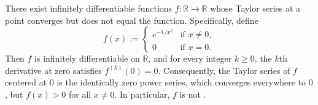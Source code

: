 \begin{theorem} \label{theorem:example_of_a_smooth_function_with_vanishing_taylor_series_not_equal_to_zero}
    There exist infinitely differentiable functions $f : \mathbb{R} \to \mathbb{R}$ whose Taylor series at a point converges but does not equal the function. Specifically, define
    $$f(x) := \begin{cases} e^{-1/x^2} & \text{if } x \neq 0, \\ 0 & \text{if } x = 0. \end{cases}$$
    Then $f$ is infinitely differentiable on $\mathbb{R}$, and for every integer $k \geq 0$, the $k$th derivative at zero satisfies $f^{(k)}(0) = 0$. Consequently, the Taylor series of $f$ centered at $0$ is the identically zero power series, which converges everywhere to $0$, but $f(x) > 0$ for all $x \neq 0$. In particular, $f$ is not .
\end{theorem}

